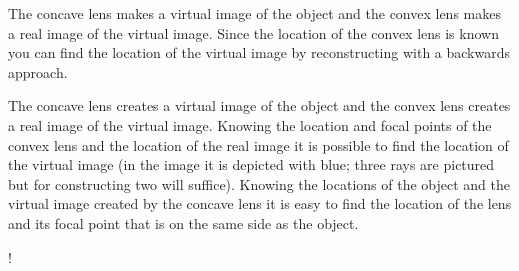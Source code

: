 {\ifEngHint
The concave lens makes a virtual image of the object and the convex lens makes a real image of the virtual image. Since the location of the convex lens is known you can find the location of the virtual image by reconstructing with a backwards approach.
\fi


\ifEngSolution
The concave lens creates a virtual image of the object and the convex lens creates a real image of the virtual image. Knowing the location and focal points of the convex lens and the location of the real image it is possible to find the location of the virtual image (in the image it is depicted with blue; three rays are pictured but for constructing two will suffice). Knowing the locations of the object and the virtual image created by the concave lens it is easy to find the location of the lens and its focal point that is on the same side as the object.\\
\begin{resizebox}{\linewidth}{!}{
		}
\end{resizebox}
\fi
}